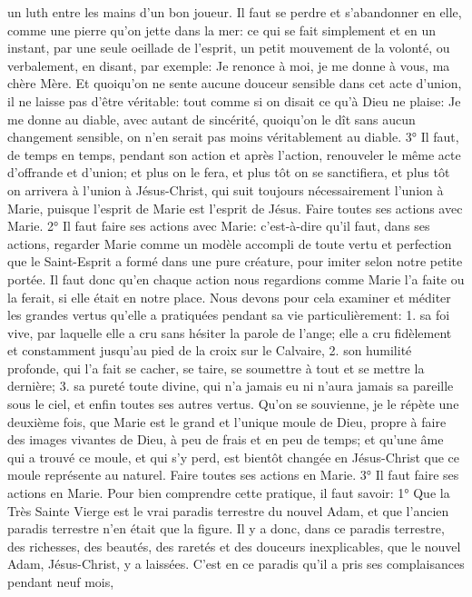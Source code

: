un luth entre les mains d'un bon joueur. Il faut se perdre et s'abandonner en elle, comme une pierre qu'on jette
dans la mer: ce qui se fait simplement et en un instant, par une seule oeillade de l'esprit, un petit mouvement de la
volonté, ou verbalement, en disant, par exemple: Je renonce à moi, je me donne à vous, ma chère Mère. Et
quoiqu'on ne sente aucune douceur sensible dans cet acte d'union, il ne laisse pas d'être véritable: tout comme si
on disait ce qu'à Dieu ne plaise: Je me donne au diable, avec autant de sincérité, quoiqu'on le dît sans aucun
changement sensible, on n'en serait pas moins véritablement au diable. 3° Il faut, de temps en temps, pendant son
action et après l'action, renouveler le même acte d'offrande et d'union; et plus on le fera, et plus tôt on se
sanctifiera, et plus tôt on arrivera à l'union à Jésus-Christ, qui suit toujours nécessairement l'union à Marie, puisque
l'esprit de Marie est l'esprit de Jésus.
Faire toutes ses actions avec Marie.
 2° Il faut faire ses actions avec Marie: c'est-à-dire qu'il faut, dans ses actions, regarder Marie comme un
modèle accompli de toute vertu et perfection que le Saint-Esprit a formé dans une pure créature, pour imiter selon
notre petite portée. Il faut donc qu'en chaque action nous regardions comme Marie l'a faite ou la ferait, si elle était
en notre place. Nous devons pour cela examiner et méditer les grandes vertus qu'elle a pratiquées pendant sa vie
particulièrement: 1. sa foi vive, par laquelle elle a cru sans hésiter la parole de l'ange; elle a cru fidèlement et
constamment jusqu'au pied de la croix sur le Calvaire, 2. son humilité profonde, qui l'a fait se cacher, se taire, se
soumettre à tout et se mettre la dernière; 3. sa pureté toute divine, qui n'a jamais eu ni n'aura jamais sa pareille
sous le ciel, et enfin toutes ses autres vertus.
Qu'on se souvienne, je le répète une deuxième fois, que Marie est le grand et l'unique moule de Dieu, propre à
faire des images vivantes de Dieu, à peu de frais et en peu de temps; et qu'une âme qui a trouvé ce moule, et qui
s'y perd, est bientôt changée en Jésus-Christ que ce moule représente au naturel.
Faire toutes ses actions en Marie.
 3° Il faut faire ses actions en Marie. Pour bien comprendre cette pratique, il faut savoir: 1° Que la Très Sainte
Vierge est le vrai paradis terrestre du nouvel Adam, et que l'ancien paradis terrestre n'en était que la figure. Il y a
donc, dans ce paradis terrestre, des richesses, des beautés, des raretés et des douceurs inexplicables, que le
nouvel Adam, Jésus-Christ, y a laissées. C'est en ce paradis qu'il a pris ses complaisances pendant neuf mois,
